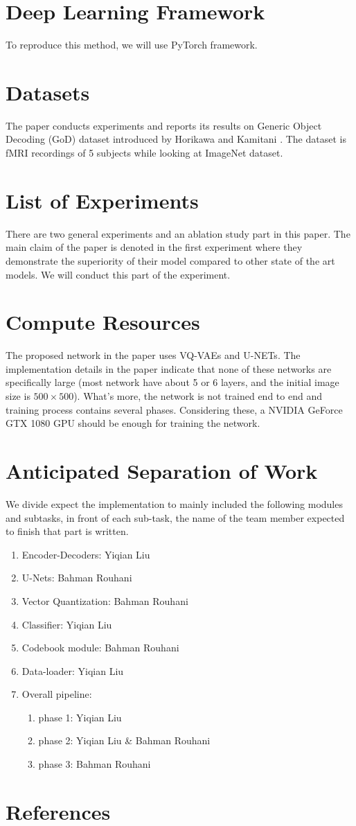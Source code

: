 \documentclass[11pt,a4paper]{article}
\begin{document}
\section{Deep Learning Framework}
To reproduce this method, we will use PyTorch framework.

\section{Datasets}
The paper conducts experiments and reports its results on Generic Object Decoding (GoD) dataset introduced by Horikawa and Kamitani \cite{horikawa2017generic}. The dataset is fMRI recordings of 5 subjects while looking at ImageNet dataset.

\section{List of Experiments}
There are two general experiments and an ablation study part in this paper. The main claim of the paper is denoted in the first experiment where they demonstrate the superiority of their model compared to other state of the art models. We will conduct this part of the experiment.

\section{Compute Resources}
The proposed network in the paper uses VQ-VAEs and U-NETs. The implementation details in the paper indicate that none of these networks are specifically large (most network have about 5 or 6 layers, and the initial image size is $500 \times 500$). What's more, the network is not trained end to end and training process contains several phases. Considering these, a NVIDIA GeForce GTX 1080 GPU should be enough for training the network.

\section{Anticipated Separation of Work}
 We divide expect the implementation to mainly included the following modules and subtasks, in front of each sub-task, the name of the team member expected to finish that part is written. 
 \begin{enumerate}
 	\item Encoder-Decoders: Yiqian Liu 
	\item U-Nets: Bahman Rouhani
	\item Vector Quantization: Bahman Rouhani
	\item Classifier: Yiqian Liu 
	\item Codebook module: Bahman Rouhani
	\item Data-loader: Yiqian Liu
	\item Overall pipeline:
	\begin{enumerate}
		\item phase 1: Yiqian Liu
		\item phase 2: Yiqian Liu  \& Bahman Rouhani
		\item phase 3: Bahman Rouhani
	\end{enumerate}
 \end{enumerate}

\section*{References}


\end{document}
